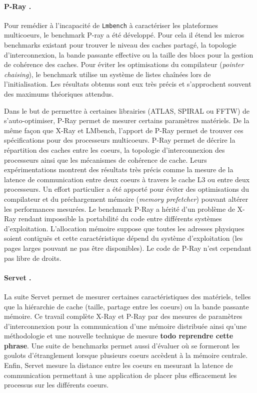        \paragraph{P-Ray \cite{Duchateau2008}.} 
        
             
            Pour remédier à l'incapacité de \verb|Lmbench| à caractériser les plateformes multicoeurs, le benchmark P-ray a été développé. Pour cela il étend les micros benchmarks existant pour trouver le niveau des caches partagé, la topologie d’interconnexion, la bande passante effective ou la taille des blocs pour la gestion de cohérence des caches. Pour éviter les optimisations du compilateur (\textit{pointer chaising}), le benchmark utilise un système de listes chaînées lors de l'initialisation. Les résultats obtenus sont eux très précis et s'approchent souvent des maximums théoriques attendus.

            Dans le but de permettre à certaines librairies (ATLAS, SPIRAL ou FFTW) de s'auto-optimiser, P-Ray permet de mesurer certains paramètres matériels. De la même façon que X-Ray et LMbench, l'apport de P-Ray permet de trouver ces spécifications pour des processeurs multicoeurs. P-Ray permet de décrire la répartition des caches entre les coeurs, la topologie d'interconnexion des processeurs ainsi que les mécanismes de cohérence de cache. Leurs expérimentations montrent des résultats très précis comme la mesure de la latence de communication entre deux coeurs à travers le cache L3 ou entre deux processeurs. Un effort particulier a été apporté pour éviter des optimisations du compilateur et du préchargement mémoire (\textit{memory prefetcher}) pouvant altérer les performances mesurées. Le benchmark P-Ray a hérité d'un problème de X-Ray rendant impossible la portabilité du code entre différents systèmes d'exploitation. L'allocation mémoire suppose que toutes les adresses physiques soient contiguës et cette caractéristique dépend du système d'exploitation (les pages larges pouvant ne pas être disponibles). Le code de P-Ray n'est cependant pas libre de droits.
        
        \paragraph{Servet \cite{gonzalez2010servet}.} 
            La suite Servet permet de mesurer certaines caractéristiques des matériels, telles que la hiérarchie de cache (taille, partage entre les coeurs) ou la bande passante mémoire. Ce travail complète X-Ray et P-Ray par des mesures de paramètres d'interconnexion pour la communication d'une mémoire distribuée ainsi qu'une méthodologie et une nouvelle technique de mesure \textbf{todo reprendre cette phrase}. Une suite de benchmarks permet aussi d'évaluer où se formeront les goulots d'étranglement lorsque plusieurs coeurs accèdent à la mémoire centrale. Enfin, Servet mesure la distance entre les coeurs en mesurant la latence de communication permettant à une application de placer plus efficacement les processus sur les différents coeurs.
               
